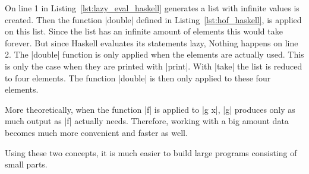 On line 1 in Listing~\ref{lst:lazy_eval_haskell} generates a
list with infinite values is created. Then the function |double| defined in
Listing~\ref{lst:hof_haskell}, is applied on this list. Since the list has an
infinite amount of elements this would take forever. But since Haskell
evaluates its statements lazy, Nothing happens on line 2. The |double| function
is only applied when the elements are actually used. This is only the case when
they are printed with |print|. With |take| the list is reduced to four
elements. The function |double| is then only applied to these four elements.

More theoretically, when the function |f| is applied to |g x|, |g| produces
only as much output as |f| actually needs. Therefore, working with a big amount
data becomes much more convenient and faster as well.

Using these two concepts, it is much easier to build large programs consisting
of small parts.

